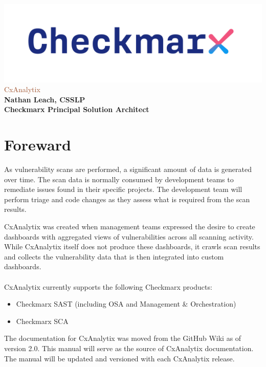\documentclass[a4paper, 11pt, oneside]{book}
\begin{document}
\begin{titlepage}
    \thispagestyle{empty}
    \centering
    \includegraphics[scale=.4]{graphics/cx_logo-dark.png}
    \vfill
    \textcolor{Sienna}{\Huge CxAnalytix\\}
    \vfill
    {\Large\textbf{Nathan Leach, CSSLP\\Checkmarx Principal Solution Architect}}
\end{titlepage}

\newpage


\tableofcontents

\chapter*{Foreward}

As vulnerability scans are performed, a significant amount of data is generated over time.  The
scan data is normally consumed by development teams to remediate issues found in their specific 
projects.  The development team will perform triage and code changes as they assess what is required 
from the scan results. 

CxAnalytix was created when management teams expressed the desire to create dashboards with
aggregated views of vulnerabilities across all scanning activity.  While CxAnalytix itself
does not produce these dashboards, it crawls scan results and collects the vulnerability
data that is then integrated into custom dashboards.\\\\

CxAnalytix currently supports the following Checkmarx products:

\begin{itemize}
    \item Checkmarx SAST (including OSA and Management \& Orchestration)
    \item Checkmarx SCA
\end{itemize}

The documentation for CxAnalytix was moved from the GitHub Wiki as of version 2.0.  This
manual will serve as the source of CxAnalytix documentation.  The manual will be updated
and versioned with each CxAnalytix release.
\end{document}

